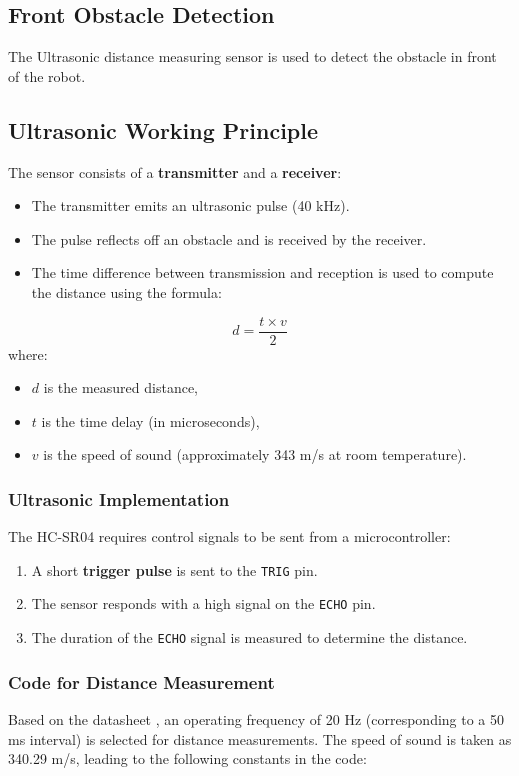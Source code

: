 
\subsection{Front Obstacle Detection}
The Ultrasonic distance measuring sensor is used to detect the obstacle in front of the robot.

\subsection{Ultrasonic Working Principle}
The sensor consists of a \textbf{transmitter} and a \textbf{receiver}:
\begin{itemize}
	\item The transmitter emits an ultrasonic pulse (40 kHz).
	\item The pulse reflects off an obstacle and is received by the receiver.
	\item The time difference between transmission and reception is used to compute the distance using the formula:
\end{itemize}
\begin{equation}
	d = \frac{t \times v}{2}
\end{equation}
where:
\begin{itemize}
	\item \(d\) is the measured distance,
	\item \(t\) is the time delay (in microseconds),
	\item \(v\) is the speed of sound (approximately 343 m/s at room temperature).
\end{itemize}

\subsubsection{Ultrasonic Implementation}
The HC-SR04 requires control signals to be sent from a microcontroller:
\begin{enumerate}
	\item A short \textbf{trigger pulse} is sent to the \texttt{TRIG} pin.
	\item The sensor responds with a high signal on the \texttt{ECHO} pin.
	\item The duration of the \texttt{ECHO} signal is measured to determine the distance.
\end{enumerate}

\subsubsection{Code for Distance Measurement}Based on the datasheet \cite{ultra-sonic}, an operating frequency of 20 Hz (corresponding to a 50 ms interval) is selected for distance measurements. The speed of sound is taken as 340.29 m/s, leading to the following constants in the code:

